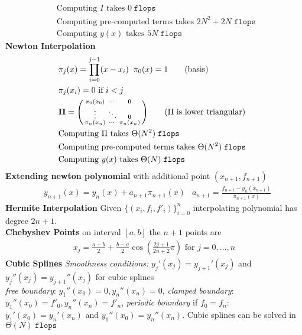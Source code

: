 \documentclass[letter, fleqn]{article}
\newcommand{\flops}{\texttt{flops }}
\begin{document}
\begin{multicols}{3}
\begin{align*}
&\text{Computing $I$ takes $0 \;\flops$}\\
&\text{Computing pre-computed terms takes $2N^2 + 2N \;\flops$}\\
&\text{Computing $y(x)$ takes $5N \;\flops$}
\end{align*}
\textbf{Newton Interpolation}
\begin{align*}
&\pi_j(x) = \prod_{i=0}^{j-1} (x-x_i)\;\; \pi_0(x) = 1 \tag{basis}\\
&\pi_j(x_i) = 0 \text{ if $i < j$} \\
&\mathbf{\Pi} = \smqty(
\pi_0(x_0) & \cdots &\mathbf{0}\\
\vdots & \ddots & \mathbf{0}\\
\pi_n(x_n) & \cdots & \pi_n(x_n)
) \tag{$\Pi$ is lower triangular}\\
&\text{Computing $\Pi$ takes $\Theta(N^2) \;\flops$}\\
&\text{Computing pre-computed terms takes $\Theta(N^2) \;\flops$}\\
&\text{Computing $y(x)$ takes $\Theta(N) \;\flops$}
\end{align*}
\textbf{Extending newton polynomial} with additional point $(x_{n+1}, f_{n+1})$
\begin{align*}
&y_{n+1}(x) = y_n(x) + a_{n+1}\pi_{n+1}(x) & a_{n+1} = \frac{f_{n+1} - y_n(x_{n+1})}{\pi_{n+1}(x)}
\end{align*}
\textbf{Hermite Interpolation} Given $\{(x_i, f_i, f'_i)\}_{i=0}^n$ interpolating polynomial has degree $\boxed{2n+1}$.\\
\textbf{Chebyshev Points} on interval $[a,b]$ the $n+1$ points are
\begin{align*}
x_j = \frac{a+b}{2} +\frac{b-a}{2}\cos(\frac{2j+1}{2n+2}\pi) \text{ for $j = 0, \ldots, n$}
\end{align*}
\textbf{Cubic Splines}
\textit{Smoothness conditions:} $y_j'(x_j) = y_{j+1}'(x_j)$ and $y_j''(x_j) = y_{j+1}''(x_j)$ for cubic splines\\
\textit{free boundary}: $y_1''(x_0) = 0, y_n''(x_n) = 0$,  \textit{clamped boundary}: $y_1''(x_0) = f'_0, y_n''(x_n) = f'_n$, \textit{periodic boundary} if $f_0 = f_n$: $y_1'(x_0) = y_n'(x_n)$ and $y_1''(x_0) = y_n''(x_n)$. Cubic splines can be solved in $\Theta(N) \;\flops$

\end{multicols}
\end{document}
